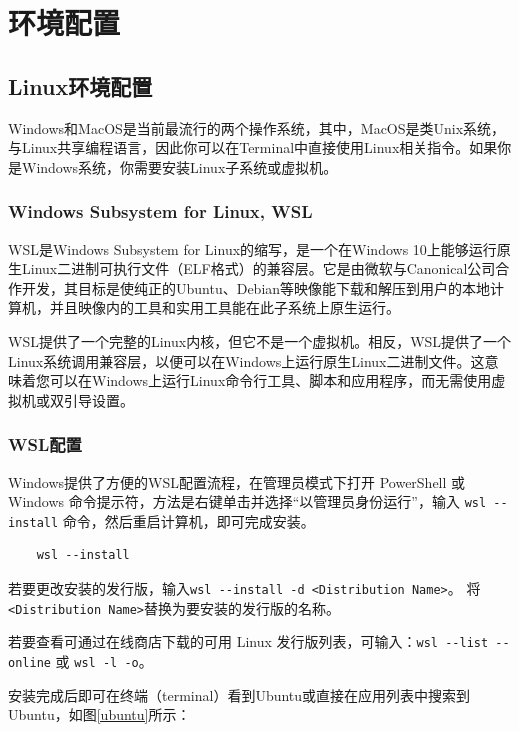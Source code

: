 \chapter{环境配置}

\section{Linux环境配置}
Windows和MacOS是当前最流行的两个操作系统，其中，MacOS是类Unix系统，与Linux共享编程语言，因此你可以在Terminal中直接使用Linux相关指令。如果你是Windows系统，你需要安装Linux子系统或虚拟机。

\subsection{Windows Subsystem for Linux, WSL}
WSL是Windows Subsystem for Linux的缩写，是一个在Windows 10上能够运行原生Linux二进制可执行文件（ELF格式）的兼容层。它是由微软与Canonical公司合作开发，其目标是使纯正的Ubuntu、Debian等映像能下载和解压到用户的本地计算机，并且映像内的工具和实用工具能在此子系统上原生运行。

WSL提供了一个完整的Linux内核，但它不是一个虚拟机。相反，WSL提供了一个Linux系统调用兼容层，以便可以在Windows上运行原生Linux二进制文件。这意味着您可以在Windows上运行Linux命令行工具、脚本和应用程序，而无需使用虚拟机或双引导设置。

\subsection{WSL配置}\cite{wsl}
Windows提供了方便的WSL配置流程，在管理员模式下打开 PowerShell 或 Windows 命令提示符，方法是右键单击并选择“以管理员身份运行”，输入 \lstinline{wsl --install} 命令，然后重启计算机，即可完成安装。

\begin{lstlisting}
    wsl --install
\end{lstlisting}

若要更改安装的发行版，输入\lstinline{wsl --install -d <Distribution Name>}。 将\lstinline{<Distribution Name>}替换为要安装的发行版的名称。

若要查看可通过在线商店下载的可用 Linux 发行版列表，可输入：\lstinline{wsl --list --online} 或 \lstinline{wsl -l -o}。

安装完成后即可在终端（terminal）看到Ubuntu或直接在应用列表中搜索到Ubuntu，如图\ref{ubuntu}所示：

